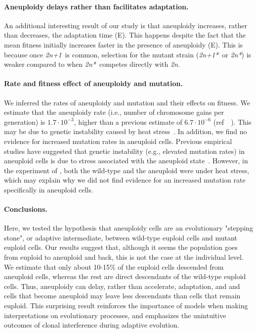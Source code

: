\documentclass[12pt]{extarticle}
\newcommand{\euwt}{\emph{2n}}
\newcommand{\anwt}{\emph{2n+1}}
\newcommand{\eumt}{\emph{2n*}}
\newcommand{\anmt}{\emph{2n+1*}}
\begin{document}
\paragraph{Aneuploidy delays rather than facilitates adaptation.}
An additional interesting result of our study is that aneuploidy increases, rather than decreases, the adaptation time (E). 
This happens despite the fact that the mean fitness initially increases faster in the presence of aneuploidy (E). 
This is because once \anwt\ is common, selection for the mutant strain (\anmt\ or \eumt) is weaker compared to when \eumt\ competes directly with \euwt.

\paragraph{Rate and fitness effect of aneuploidy and mutation.}
We inferred the rates of aneuploidy and mutation and their effects on fitness. 
We estimate that the aneuploidy rate (i.e., number of chromosome gains per generation) is $1.7 \cdot 10^{-3}$, higher than a previous estimate of $6.7 \cdot 10^{-6}$ (ref~~\citep{Zhu2016}). This may be due to genetic instability caused by heat stress~\citep{Chen2012a}.
In addition, we find no evidence for increased mutation rates in aneuploid cells. 
Previous empirical studies have suggested that genetic instability (e.g., elevated mutation rates) in aneuploid cells is due to stress associated with the aneuploid state~\citep{Bouchonville2009, Chen2012b, Zhu2012, Ippolito2021b}.
However, in the experiment of \citet{Yona2012}, both the wild-type and the aneuploid were under heat stress, which may explain why we did not find evidence for an increased mutation rate specifically in aneuploid cells.

\paragraph{Conclusions.}
Here, we tested the hypothesis that aneuploidy cells are an evolutionary "stepping stone", or adaptive intermediate, between wild-type euploid cells and mutant euploid cells. 
Our results suggest that, although it seems the population goes from euploid to aneuploid and back, this is not the case at the individual level. We estimate that only about 10-15\% of the euploid cells descended from aneuploid cells, whereas the rest are direct descendants of the wild-type euploid cells. Thus, aneuploidy can delay, rather than accelerate, adaptation, and and cells that become aneuploid may leave less descendants than cells that remain euploid. 
This surprising result reinforces the importance of models when making interpretations on evolutionary processes, and emphasizes the unintuitive outcomes of clonal interference during adaptive evolution.
\end{document}
